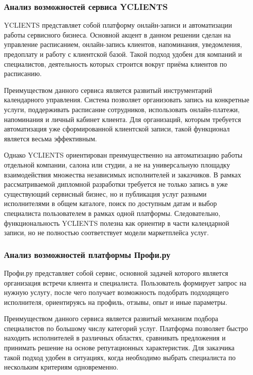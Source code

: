 \subsubsection{Анализ возможностей сервиса YCLIENTS}

YCLIENTS представляет собой платформу онлайн-записи и автоматизации работы сервисного бизнеса. Основной акцент в данном решении сделан на управление расписанием, онлайн-запись клиентов, напоминания, уведомления, предоплату и работу с клиентской базой. Такой подход удобен для компаний и специалистов, деятельность которых строится вокруг приёма клиентов по расписанию.

Преимуществом данного сервиса является развитый инструментарий календарного управления. Система позволяет организовать запись на конкретные услуги, поддерживать расписание сотрудников, использовать онлайн-платежи, напоминания и личный кабинет клиента. Для организаций, которым требуется автоматизация уже сформированной клиентской записи, такой функционал является весьма эффективным.

Однако YCLIENTS ориентирован преимущественно на автоматизацию работы отдельной компании, салона или студии, а не на универсальную площадку взаимодействия множества независимых исполнителей и заказчиков. В рамках рассматриваемой дипломной разработки требуется не только запись в уже существующий сервисный бизнес, но и публикация услуг разными исполнителями в общем каталоге, поиск по доступным датам и выбор специалиста пользователем в рамках одной платформы. Следовательно, функциональность YCLIENTS полезна как ориентир в части календарной записи, но не полностью соответствует модели маркетплейса услуг.

\subsubsection{Анализ возможностей платформы Профи.ру}

Профи.ру представляет собой сервис, основной задачей которого является организация встречи клиента и специалиста. Пользователь формирует запрос на нужную услугу, после чего получает возможность подобрать подходящего исполнителя, ориентируясь на профиль, отзывы, опыт и иные параметры.

Преимуществом данного сервиса является развитый механизм подбора специалистов по большому числу категорий услуг. Платформа позволяет быстро находить исполнителей в различных областях, сравнивать предложения и принимать решение на основе репутационных характеристик. Для заказчика такой подход удобен в ситуациях, когда необходимо выбрать специалиста по нескольким критериям одновременно.

